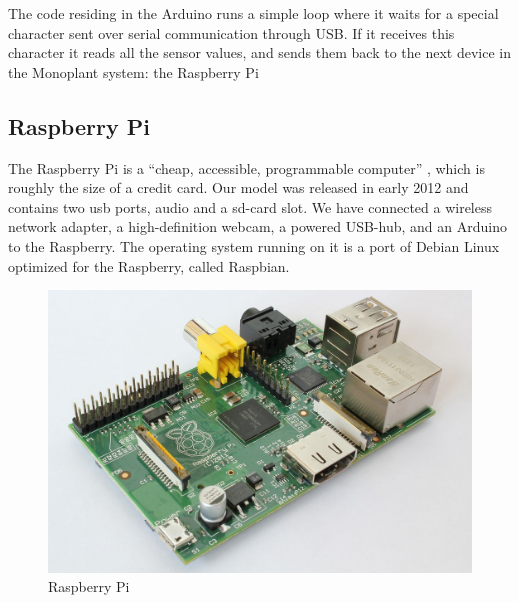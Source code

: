 The code residing in the Arduino runs a simple loop where it waits for a special character sent over serial communication through USB. If it receives this character it reads all the sensor values, and sends them back to the next device in the Monoplant system: the Raspberry Pi

\subsection{Raspberry Pi}
The Raspberry Pi is a “cheap, accessible, programmable computer” \citep{Raspberrypi}, which is roughly the size of a credit card. Our model was released in early 2012 and contains two usb ports, audio and a sd-card slot. We have connected a wireless network adapter, a high-definition webcam, a powered USB-hub, and an Arduino to the Raspberry. The operating system running on it is a port of Debian Linux optimized for the Raspberry, called Raspbian. 

\begin{figure}
\centering
\includegraphics[width=1\textwidth]{img/hardware/1200px-RaspberryPi.jpg}
\caption{Raspberry Pi}
\label{fig:Raspberry}
\end{figure}


